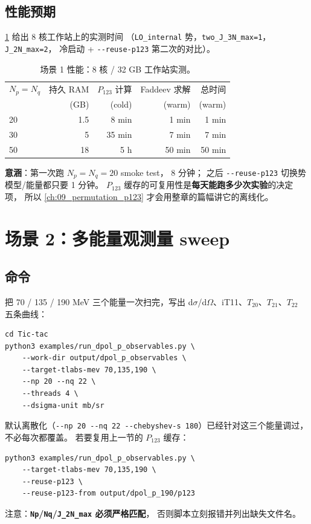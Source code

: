 \subsection{性能预期}
\label{sec:ch20-s1-perf}

\cref{tab:ch20-s1-perf} 给出 8 核工作站上的实测时间
（\texttt{LO\_internal} 势，\texttt{two\_J\_3N\_max=1}，\texttt{J\_2N\_max=2}，
冷启动 + \texttt{-{}-reuse-p123} 第二次的对比）。

\begin{table}[ht]
\centering
\small
\caption{场景 1 性能：8 核 / 32 GB 工作站实测。}
\label{tab:ch20-s1-perf}
\begin{tabular}{@{}lrrrr@{}}
\toprule
$N_p = N_q$ & 持久 RAM & $P_{123}$ 计算 & Faddeev 求解 & 总时间 \\
            & (GB)     & (cold)         & (warm)       & (warm) \\
\midrule
20  & 1.5  & 8 min   & 1 min   & 1 min   \\
30  & 5    & 35 min  & 7 min   & 7 min   \\
50  & 18   & 5 h     & 50 min  & 50 min  \\
\bottomrule
\end{tabular}
\end{table}
\textbf{意涵}：第一次跑 $N_p=N_q=20$ smoke test，
8 分钟；
之后 \texttt{-{}-reuse-p123} 切换势模型/能量都只要 1 分钟。
$P_{123}$ 缓存的可复用性是\textbf{每天能跑多少次实验}的决定项，
所以 \cref{ch:09_permutation_p123} 才会用整章的篇幅讲它的离线化。

\section{场景 2：多能量观测量 sweep}
\label{sec:ch20-scenario-multi}

\subsection{命令}
\label{sec:ch20-s2-cmd}

把 70 / 135 / 190 MeV 三个能量一次扫完，写出 d$\sigma$/d$\Omega$、iT11、$T_{20}$、$T_{21}$、$T_{22}$ 五条曲线：
\begin{lstlisting}[style=config,caption={多能量 dpol-p 观测量 sweep。}]
cd Tic-tac
python3 examples/run_dpol_p_observables.py \
    --work-dir output/dpol_p_observables \
    --target-tlabs-mev 70,135,190 \
    --np 20 --nq 22 \
    --threads 4 \
    --dsigma-unit mb/sr
\end{lstlisting}
默认离散化（\texttt{-{}-np 20 -{}-nq 22 -{}-chebyshev-s 180}）已经针对这三个能量调过，
不必每次都覆盖。
若要复用上一节的 $P_{123}$ 缓存：
\begin{lstlisting}[style=config]
python3 examples/run_dpol_p_observables.py \
    --target-tlabs-mev 70,135,190 \
    --reuse-p123 \
    --reuse-p123-from output/dpol_p_190/p123
\end{lstlisting}
注意：\textbf{\texttt{Np}/\texttt{Nq}/\texttt{J\_2N\_max} 必须严格匹配}，
否则脚本立刻报错并列出缺失文件名。

